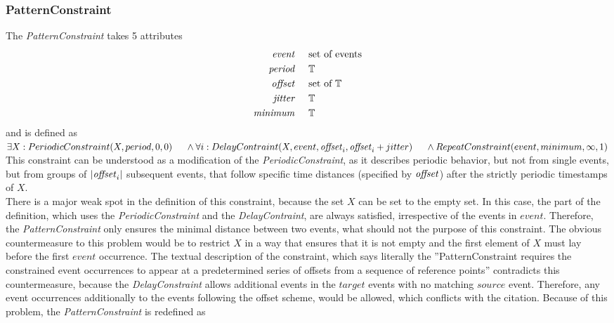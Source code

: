 		
	\subsubsection{PatternConstraint}
		\label{sec:patterConstraintDefinition}
		The \emph{PatternConstraint} takes 5 attributes
		\begin{align*}
			\emph{event} 	& \hspace{.5cm}\text{set of events}\\
			\emph{period} 	& \hspace{.5cm}\mathbb{T}\\
			\emph{offset}	& \hspace{.5cm} \text{set of }\mathbb{T}\\
			\emph{jitter}	& \hspace{.5cm}\mathbb{T}\\
			\emph{minimum}	& \hspace{.5cm}\mathbb{T}
		\end{align*}
		and is defined as \\[10pt]
		\begin{math}
			\exists X: PeriodicConstraint(X, period, 0, 0)\\
			\text{\hspace{.5cm}} \land \forall i: DelayContraint(X, event, \text{\textit{offset}}_i,  \text{\textit{offset}}_i+jitter)\\
			\text{\hspace{.5cm}} \land RepeatConstraint(event, minimum, \infty, 1)
		\end{math}\\[10pt]
		This constraint can be understood as a modification of the \emph{PeriodicConstraint}, as it describes periodic behavior, but not from single events, but from groups of $| \text{\textit{offset}}_i|$ subsequent events, that follow specific time distances (specified by $\text{\textit{offset}}$) after the strictly periodic timestamps of $X$.\\
		There is a major weak spot in the definition of this constraint, because the set $X$ can be set to the empty set. In this case, the part of the definition, which uses the \emph{PeriodicConstraint} and the \emph{DelayContraint}, are always satisfied, irrespective of the events in $event$. Therefore, the \emph{PatternConstraint} only ensures the minimal distance between two events, what should not the purpose of this constraint. 
		The obvious countermeasure to this problem would be to restrict $X$ in a way that ensures that it is not empty and the first element of $X$ must lay before the first $event$ occurrence. The textual description of the constraint, which says literally the ''PatternConstraint requires the constrained event occurrences to appear at a predetermined series of offsets from a sequence of reference points'' contradicts this countermeasure, because the \emph{DelayConstraint} allows additional events in the $target$ events with no matching $source$ event. Therefore, any event occurrences additionally to the events following the offset scheme, would be allowed, which conflicts with the citation. Because of this problem, the \emph{PatternConstraint} is redefined as \\[10pt]
